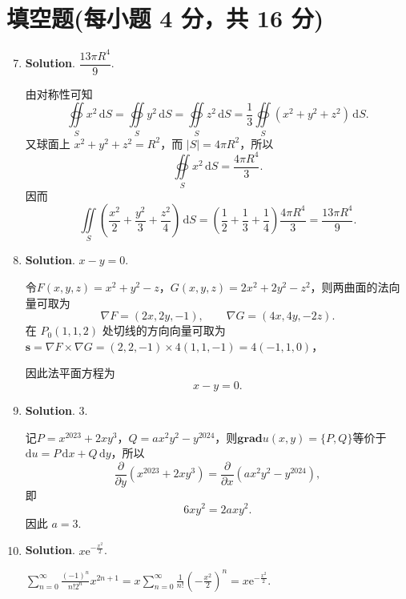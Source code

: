 \documentclass[../main.tex]{subfiles}
\begin{document}
\section{填空题(每小题 4 分，共 16 分)}
\begin{enumerate}
    \setcounter{enumi}{6}
    \item \textbf{Solution}. $\dfrac{13\pi R^4}{9}$.

          由对称性可知
          \[
              \oiint\limits_S x^2\,\mathrm{d}S=\oiint\limits_S y^2\,\mathrm{d}S=\oiint\limits_S z^2\,\mathrm{d}S
              =\frac13\oiint\limits_S (x^2+y^2+z^2)\,\mathrm{d}S.
          \]
          又球面上 \(x^2+y^2+z^2=R^2\)，而 \(|S|=4\pi R^2\)，所以
          \[
              \oiint\limits_S x^2\,\mathrm{d}S=\frac{4\pi R^4}{3}.
          \]
          因而
          \[
              \iint\limits_S\left(\frac{x^2}{2}+\frac{y^2}{3}+\frac{z^2}{4}\right)\,\mathrm{d}S
              =\left(\frac12+\frac13+\frac14\right)\frac{4\pi R^4}{3}
              =\frac{13\pi R^4}{9}.
          \]

    \item \textbf{Solution}. $x-y=0$.

          令$F(x,y,z)=x^2+y^2-z$，$G(x,y,z)=2x^2+2y^2-z^2$，则两曲面的法向量可取为
          \[
              \nabla F=(2x,2y,-1),\qquad \nabla G=(4x,4y,-2z).
          \]
          在 \(P_0(1,1,2)\) 处切线的方向向量可取为$\boldsymbol{s}=\nabla F\times\nabla G=(2,2,-1)\times 4(1,1,-1)=4(-1,1,0)$，

          因此法平面方程为
          \[
              x-y=0.
          \]

    \item \textbf{Solution}. $3$.

          记$P=x^{2023}+2xy^3$，$Q=ax^2y^2-y^{2024}$，则$\mathbf{grad } u(x,y)=\{P,Q\}$等价于$\mathrm{d}u=P\,\mathrm{d}x+Q\,\mathrm{d}y$，所以
          \[
              \frac{\partial}{\partial y}(x^{2023}+2xy^3)
              =\frac{\partial}{\partial x}(ax^2y^2-y^{2024}),
          \]
          即
          \[
              6xy^2=2axy^2.
          \]
          因此 \(a=3\).

    \item \textbf{Solution}. $x\mathrm{e}^{-\frac{x^2}{2}}$.

          $\sum_{n=0}^{\infty}\frac{(-1)^n}{n!2^n}x^{2n+1}=x\sum_{n=0}^{\infty}\frac{1}{n!}\left(-\frac{x^2}{2}\right)^{n}=x\mathrm{e}^{-\frac{x^2}{2}}$.

\end{enumerate}
\end{document}
